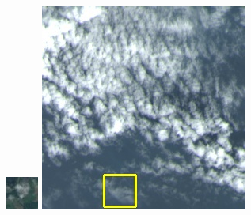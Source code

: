 \documentclass[10pt]{ctexart}
\begin{document}
\begin{multicols}{2}
\begin{figure}[H]
{\begin{minipage}[b]{0.15\linewidth}
            \includegraphics[width=1\linewidth]{../log/spoon2/cut2/tmp_cut_LC80460282014171LGN00_12434_color.jpg}\vspace{4pt}
            \includegraphics[width=1\linewidth]{../log/spoon2/cut2/LC81620432014072LGN00_16237_color.jpg}\vspace{4pt}

\end{minipage}}
\end{figure}
\end{multicols}
\end{document}
